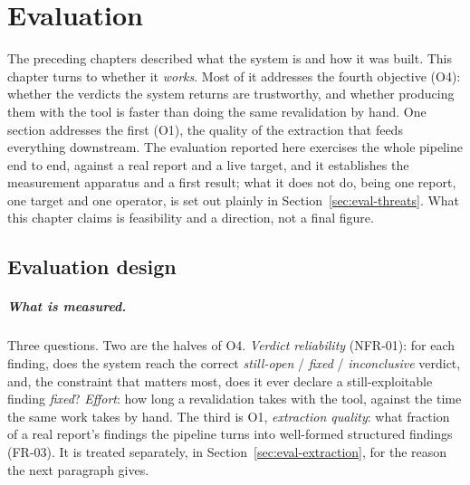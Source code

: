 \chapter{Evaluation}
\label{ch:evaluation}

\setlength{\emergencystretch}{3em}

The preceding chapters described what the system is and how it was built. This
chapter turns to whether it \emph{works}. Most of it addresses the fourth objective
(O4): whether the verdicts the system returns are trustworthy, and whether
producing them with the tool is faster than doing the same revalidation by hand. One
section addresses the first (O1), the quality of the extraction that feeds
everything downstream. The evaluation reported here exercises the whole pipeline end to
end, against a real report and a live target, and it establishes the measurement
apparatus and a first result; what it does not do, being one report, one target and one
operator, is set out plainly in Section~\ref{sec:eval-threats}. What
this chapter claims is feasibility and a direction, not a final figure.

\section{Evaluation design}
\label{sec:eval-design}

\paragraph{What is measured.} Three questions. Two are the halves of O4.
\emph{Verdict reliability} (NFR-01): for each finding, does the system reach the
correct \emph{still-open} / \emph{fixed} / \emph{inconclusive} verdict, and, the
constraint that matters most, does it ever declare a still-exploitable finding
\emph{fixed}? \emph{Effort}: how long a revalidation takes with the tool, against the
time the same work takes by hand. The third is O1, \emph{extraction quality}: what
fraction of a real report's findings the pipeline turns into well-formed structured
findings (FR-03). It is treated separately, in
Section~\ref{sec:eval-extraction}, for the reason the next
paragraph gives.

